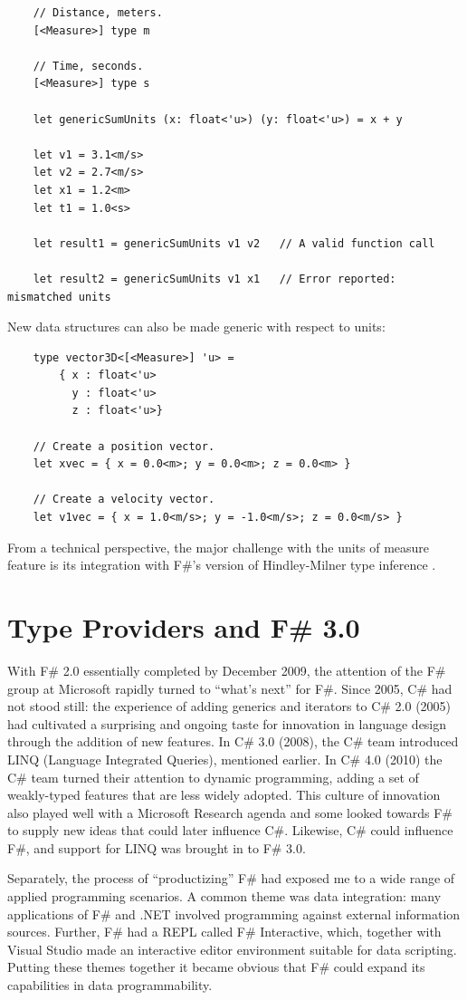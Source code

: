 \documentclass[acmsmall]{acmart}\settopmatter{}
\begin{document}
\begin{verbatim}
    // Distance, meters.
    [<Measure>] type m

    // Time, seconds.
    [<Measure>] type s

    let genericSumUnits (x: float<'u>) (y: float<'u>) = x + y

    let v1 = 3.1<m/s>
    let v2 = 2.7<m/s>
    let x1 = 1.2<m>
    let t1 = 1.0<s>

    let result1 = genericSumUnits v1 v2   // A valid function call

    let result2 = genericSumUnits v1 x1   // Error reported: mismatched units
\end{verbatim}
New data structures can also be made generic with respect to units:
\begin{verbatim}
    type vector3D<[<Measure>] 'u> =
        { x : float<'u>
          y : float<'u>
          z : float<'u>}

    // Create a position vector.
    let xvec = { x = 0.0<m>; y = 0.0<m>; z = 0.0<m> }

    // Create a velocity vector.
    let v1vec = { x = 1.0<m/s>; y = -1.0<m/s>; z = 0.0<m/s> }
\end{verbatim}
From a technical perspective, the major challenge with the units of measure feature is its integration with F\#’s version of Hindley-Milner type inference \citep{Kennedy2009}.


\section*{Type Providers and F\# 3.0 }

With F\# 2.0 essentially completed by December 2009, the attention of the F\# group at Microsoft rapidly turned to “what’s next”
for F\#. Since 2005, C\# had not stood still: the experience of adding generics and iterators to C\# 2.0 (2005) had cultivated a
surprising and ongoing taste for innovation in language design through the addition of new features.  In C\# 3.0 (2008), the
C\# team introduced LINQ (Language Integrated Queries), mentioned earlier. In C\# 4.0 (2010) the C\# team turned their
attention to dynamic programming, adding a set of weakly-typed features that are less widely adopted. This culture of innovation
also played well with a Microsoft Research agenda and some looked towards F\# to supply new ideas that could later influence
C\#.  Likewise, C\# could influence F\#, and support for LINQ was brought in to F\# 3.0.

Separately, the process of “productizing” F\# had exposed me to a wide range of applied programming scenarios.  A common theme
was data integration: many applications of F\# and .NET involved programming against external information sources.  Further, F\# had
a REPL called F\# Interactive, which, together with Visual Studio made an interactive editor environment suitable for data scripting.
Putting these themes together it became obvious that F\# could expand its capabilities in data programmability.
\end{document}
